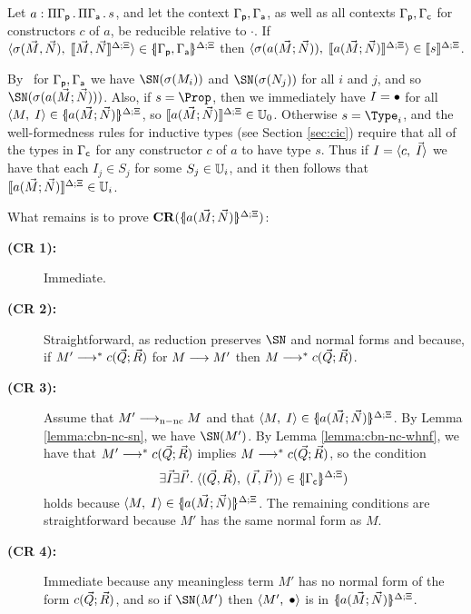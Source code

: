 \documentclass{article}
\begin{document}
\begin{myproof}
\begin{lemma}
  \label{lemma:ind-types}
  Let $a:\pigamma{\Gammap}{\pigamma{\Gammaa}{s}}$, and let the context
  $\Gammap,\Gammaa$, as well as all contexts $\Gammap,\Gammac$ for
  constructors $c$ of $a$, be reducible relative to $\cdot$.  If
  $\pair{\sigma(\vec{M},\vec{N})}{\interp{\vec{M},\vec{N}}}\in\interpd{\Gammap,\Gammaa}$
  then
  $\pair{\sigma(\ctorapp{a}{\vec{M}}{\vec{N}})}{\interp{\ctorapp{a}{\vec{M}}{\vec{N}}}}\in
  \interp{s}$.
\end{lemma}

\iftechreport
\begin{myproof}
  By \CRone\ for $\Gammap,\Gammaa$ we have $\SN(\sigma(M_i))$ and
  $\SN(\sigma(N_j))$ for all $i$ and $j$, and so
  $\SN(\sigma(\ctorapp{a}{\vec{M}}{\vec{N}}))$. Also, if $s=\Prop$,
  then we immediately have $I=\dummy$ for all
  $\pair{M}{I}\in\interpd{\ctorapp{a}{\vec{M}}{\vec{N}}}$, so
  $\interp{\ctorapp{a}{\vec{M}}{\vec{N}}}\in\Ui[0]$.  Otherwise
  $s=\Type_i$, and the well-formedness rules for inductive types (see
  Section \ref{sec:cic}) require that all of the types in $\Gammac$
  for any constructor $c$ of $a$ to have type $s$. Thus if
  $I=\pair{c}{\vec{I}}$ we have that each $I_j\in S_j$ for some
  $S_j\in\Ui$, and it then follows that
  $\interp{\ctorapp{a}{\vec{M}}{\vec{N}}}\in\Ui[i]$.

  What remains is to prove
  $\CRnot{\interpd{\ctorapp{a}{\vec{M}}{\vec{N}}}}$:
  \begin{description}
  \item[\textbf{(CR 1):}] \hspace*{10pt} Immediate.
  \item[\textbf{(CR 2):}] \hspace*{10pt} Straightforward, as reduction
    preserves $\SN$ and normal forms and because, if
    $M'\rrtostar\ctorapp{c}{\vec{Q}}{\vec{R}}$ for $M\rrto M'$ then
    $M\rrtostar\ctorapp{c}{\vec{Q}}{\vec{R}}$.
  \item[\textbf{(CR 3):}] \hspace*{10pt} Assume that $M'\rrtocbnnc M$
    and that $\pair{M}{I}\in\interpd{\ctorapp{a}{\vec{M}}{\vec{N}}}$.
    By Lemma \ref{lemma:cbn-nc-sn}, we have $\SN(M')$. By Lemma
    \ref{lemma:cbn-nc-whnf}, we have that
    $M'\rrtostar\ctorapp{c}{\vec{Q}}{\vec{R}}$ implies
    $M\rrtostar\ctorapp{c}{\vec{Q}}{\vec{R}}$, so the condition
    \[
    \exists\vec{I}\exists\vec{I'}.\;
    \pair{(\vec{Q},\vec{R})}{(\vec{I},\vec{I'})}\in\interpd{\Gammac})
    \]
    holds because
    $\pair{M}{I}\in\interpd{\ctorapp{a}{\vec{M}}{\vec{N}}}$.  The
    remaining conditions are straightforward because $M'$ has the same
    normal form as $M$.
  \item[\textbf{(CR 4):}] \hspace*{10pt} Immediate because any
    meaningless term $M'$ has no normal form of the form
    $\ctorapp{c}{\vec{Q}}{\vec{R}}$, and so if $\SN(M')$ then
    $\pair{M'}{\dummy}$ is in
    $\interpd{\ctorapp{a}{\vec{M}}{\vec{N}}}$.
  \end{description}
\end{myproof}
\fi



\end{myproof}
\end{document}
